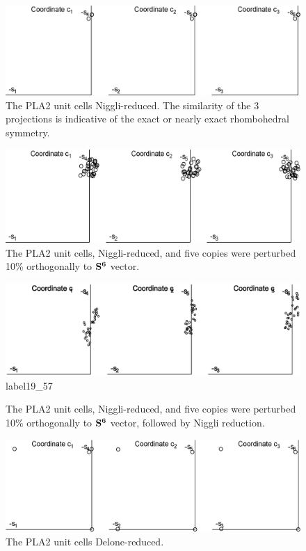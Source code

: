 \documentclass[]{iucr}              %
\numberwithin{equation}{section}
\newcommand{\SVI}[0]{$\bf{S^{6}}$}
\begin{document}
	\begin{figure}
		\includegraphics[width=1.0\textwidth]{2_06}
		\caption{The PLA2 unit cells Niggli-reduced. The similarity 
			of the 3 projections is indicative of the exact or nearly
			exact rhombohedral symmetry.}
		\label{fig2}
	\end{figure}
	
\begin{figure}
	\includegraphics[width=1.0\textwidth]{5_21}
	\caption{The PLA2 unit cells, Niggli-reduced, and five copies were perturbed 10\%
		orthogonally to \SVI{} vector. }
	\label{fig5}	
\end{figure}

\begin{figure}
	\includegraphics[width=1.0\textwidth]{19_57}
	label{19\_57}
	\caption{The PLA2 unit cells, Niggli-reduced, and five copies were perturbed 10\%
		orthogonally to \SVI{} vector, followed by Niggli reduction.}
\end{figure}

	\begin{figure}
		\includegraphics[width=1.0\textwidth]{3_03}
		\caption{The PLA2 unit cells Delone-reduced. }
		\label{fig3}
	\end{figure}
	
\end{document}
